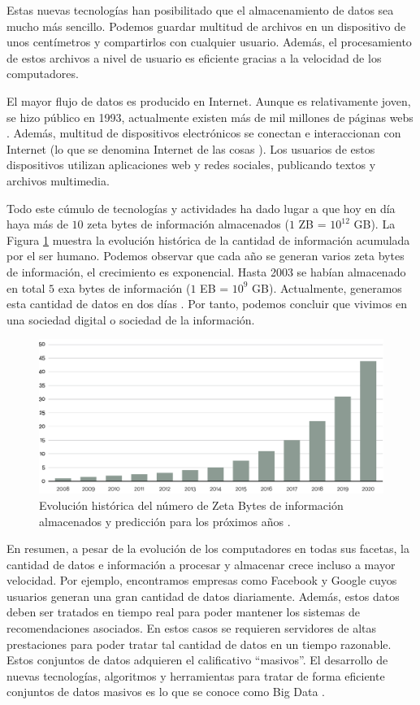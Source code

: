 \documentclass[10pt]{article}
\begin{document}
	Estas nuevas tecnologías han posibilitado que el almacenamiento de datos sea mucho más sencillo. Podemos guardar multitud de archivos en un dispositivo de unos centímetros y compartirlos con cualquier usuario. Además, el procesamiento de estos archivos a nivel de usuario es eficiente gracias a la velocidad de los computadores. 
	
	El mayor flujo de datos es producido en Internet. Aunque es relativamente joven, se hizo público en 1993, actualmente existen más de mil millones de páginas webs \cite{internet}. Además, multitud de dispositivos electrónicos se conectan e interaccionan con Internet (lo que se denomina Internet de las cosas \cite{big-data-internet-cosas}). Los usuarios de estos dispositivos utilizan aplicaciones web y redes sociales, publicando textos y archivos multimedia. 
	
	Todo este cúmulo de tecnologías y actividades ha dado lugar a que hoy en día haya más de $10$ zeta bytes de información almacenados ($1$ ZB = $10^{12}$ GB). La Figura \ref{fig:zeta-bytes} muestra la evolución histórica de la cantidad de información acumulada por el ser humano. Podemos observar que cada año se generan varios zeta bytes de información, el crecimiento es exponencial. Hasta 2003 se habían almacenado en total $5$ exa bytes de información ($1$ EB = $10^9$ GB). Actualmente, generamos esta cantidad de datos en dos días \cite{big-data}. Por tanto, podemos concluir que vivimos en una sociedad digital o sociedad de la información.

	\begin{figure}[H]
       	\centering
       	\includegraphics[width=14cm]{./images/Data.png}
       	\caption{Evolución histórica del número de Zeta Bytes de información almacenados y predicción para los próximos años \cite{zeta-bytes}.} 
       	\label{fig:zeta-bytes}
	 \end{figure}

	En resumen, a pesar de la evolución de los computadores en todas sus facetas, la cantidad de datos e información a procesar y almacenar crece incluso a mayor velocidad. Por ejemplo, encontramos empresas como Facebook y Google cuyos usuarios generan una gran cantidad de datos diariamente. Además, estos datos deben ser tratados en tiempo real para poder mantener los sistemas de recomendaciones asociados. En estos casos se requieren servidores de altas prestaciones para poder tratar tal cantidad de datos en un tiempo razonable. Estos conjuntos de datos adquieren el calificativo ``masivos''. El desarrollo de nuevas tecnologías, algoritmos y herramientas para tratar de forma eficiente conjuntos de datos masivos es lo que se conoce como Big Data \cite{big-data-herrera}.
	
\end{document}
